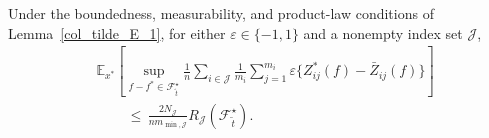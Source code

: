 \documentclass[twoside,11pt]{article}
\newenvironment{revision}{\color{revisionred}}{}
\begin{document}
\begin{revision}
\begin{corollary}
\label{col_tilde_E_3}
Under the boundedness, measurability, and product-law conditions of
Lemma~\ref{col_tilde_E_1}, for either $\varepsilon\in\{-1,1\}$ and a
nonempty index set $\mathcal J$,
\begin{equation}
\label{eq_nonconvex_design_component}
\begin{aligned}
&\mathbb E_{x^*}\left[
\sup_{f-f^*\in\mathcal F_{\tilde t}^{\star}}
\frac1n\sum_{i\in\mathcal J}\frac1{m_i}\sum_{j=1}^{m_i}
\varepsilon\{Z_{ij}^*(f)-\bar Z_{ij}(f)\}\right]\\
&\qquad\,\leq\,\frac{2N_{\mathcal J}}{n m_{\min,\mathcal J}}
R_{\mathcal J}(\mathcal F_{\tilde t}^{\star}).
\end{aligned}
\end{equation}
\end{corollary}


\end{revision}
\end{document}
